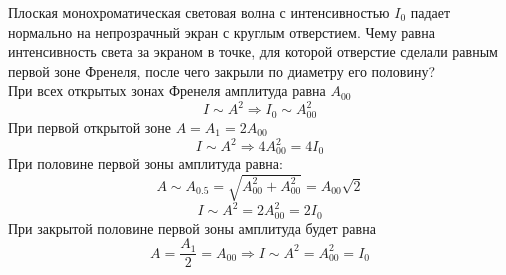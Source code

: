 \documentclass[__main__.tex]{subfiles}
\begin{document}
Плоская монохроматическая световая волна с интенсивностью $I_0$ падает нормально на непрозрачный экран с круглым отверстием. Чему равна интенсивность света за экраном в точке, для которой отверстие сделали равным первой зоне Френеля, после чего закрыли по диаметру его половину?\\ 

При всех открытых зонах Френеля амплитуда равна $A_00$
$$I \sim A^2 \Rightarrow I_0 \sim A_{00} ^ 2$$
При первой открытой зоне $A=A_1=2A_{00}$
$$I\sim A^2 \Rightarrow 4A_00 ^2 = 4I_0 $$
При половине первой зоны амплитуда равна:
$$A\sim A_{0.5} = \sqrt{A_{00}^2 + A_{00}^2}=A_{00} \sqrt{2}$$
$$I\sim A^2 = 2A_{00}^2 = 2I_0$$
При закрытой половине первой зоны амплитуда будет равна 
$$A=\frac{A_1}{2}=A_{00} \Rightarrow I \sim A^2 = A_{00}^2 =I_0$$
\end{document}
